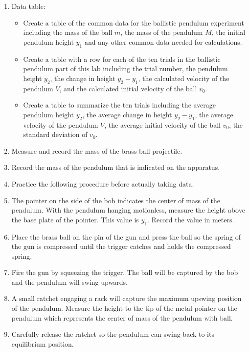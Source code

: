 \begin{enumerate}
\item Data table:
\begin{itemize}
\item Create a table of the common data for the ballistic pendulum experiment including the mass of the ball $m$, the mass of the pendulum $M$, the initial pendulum height $y_1$ and any other common data needed for calculations.
\item Create a table with a row for each of the ten trials in the ballistic pendulum part of this lab including the trial number, %
the pendulum height $y_2$, the change in height $y_2-y_1$, the calculated velocity of the pendulum $V$, and the calculated initial velocity of the ball $v_0$.
\item Create a table to summarize the ten trials including the average pendulum height $y_2$, the average change in height $y_2-y_1$, the average velocity of the pendulum $V$, the average initial velocity of the ball $v_0$, the standard deviation of $v_0$.%
\end{itemize}
\item Measure and record the mass of the brass ball projectile.
\item Record the mass of the pendulum that is indicated on the apparatus.
\item Practice the following procedure before actually taking data.
\item The pointer on the side of the bob indicates the center of mass of the pendulum.  With the pendulum hanging motionless, measure the height above the base plate of the pointer.  This value is $y_1$.   Record the value in meters.
\item Place the brass ball on the pin of the gun and press the ball so the spring of the gun is compressed until the trigger catches and holds the compressed spring.
\item Fire the gun by squeezing the trigger.  The ball will be captured by the bob and the pendulum will swing upwards.
\item A small ratchet engaging a rack will capture the maximum upswing position of the pendulum. %
Measure the height to the tip of the metal pointer on the pendulum which represents the center of mass of the pendulum with ball.
\item Carefully release the ratchet so the pendulum can swing back to its equilibrium position.

\end{enumerate}
